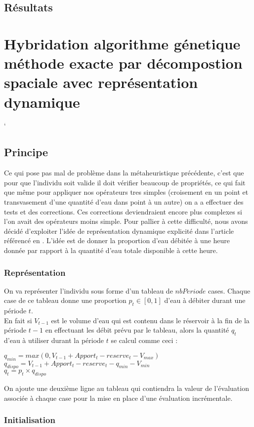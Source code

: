 \documentclass[a4paper]{report}
\begin{document}
\subsection{Résultats}
\section{Hybridation algorithme génetique méthode exacte par décompostion spaciale avec représentation dynamique}`
\subsection{Principe}
Ce qui pose pas mal de problème dans la métaheuristique précédente, c'est que pour que l'individu soit valide il doit vérifier beaucoup de propriétés, ce qui fait que même pour appliquer nos opérateurs tres simples (croisement en un point et transvasement d'une quantité d'eau dans point à un autre) on a a effectuer des tests et des corrections. Ces corrections deviendraient encore plus complexes si l'on avait des opérateurs moins simple. Pour pallier à cette difficulté, nous avons décidé d'exploiter l'idée de représentation dynamique explicité dans l'article référencé en . L'idée est de donner la proportion d'eau débitée à une heure donnée par rapport à la quantité d'eau totale disponible à cette heure. 

\subsubsection*{Représentation}
On va représenter l'individu sous forme d'un tableau de $nbPeriode$ cases. 
Chaque case de ce tableau donne une proportion $p_t \in [0,1]$ d'eau à débiter durant une période $t$.\\
En fait si $V_{t-1}$ est le volume d'eau qui  est contenu dans le réservoir à la fin de la période $t-1 $ en effectuant les débit prévu par le tableau, alors la quantité $q_t$ d'eau à utiliser durant la période $t$ se calcul comme ceci :\\
 \begin{center}
   $q_{min}=max(0, V_{t-1}+Apport_t-reserve_t -V_{max})$\\
   $q_{dispo}=  V_{t-1}+Apport_t-reserve_t -q_{min} -V_{min}$\\
   $q_t= p_t \times q_{dispo}$
 \end{center}
 On ajoute une deuxième ligne au tableau qui contiendra la valeur de l'évaluation associée à chaque case pour la mise en place d'une évaluation incrémentale.
 \subsubsection*{Initialisation}
\end{document}
